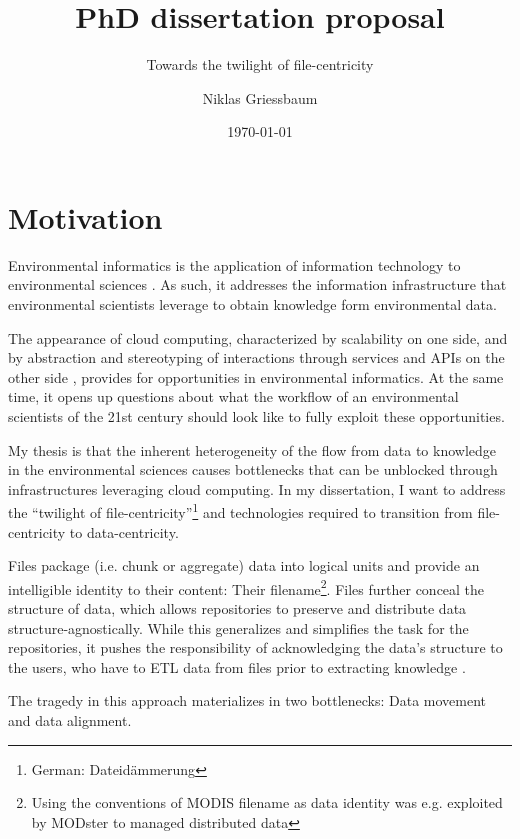 \documentclass[letterpaper, parskip=half]{scrartcl}
\title{PhD dissertation proposal}
\subtitle{Towards the twilight of file-centricity}
\author{Niklas Griessbaum}
\date{\today}
\begin{document}
\maketitle

\newpage
\tableofcontents

\newpage
\printglossaries


\newpage

\section{Motivation}

Environmental informatics is the application of information technology to environmental sciences \citep{Frew2012}.
As such, it addresses the information infrastructure that environmental scientists leverage
to obtain knowledge form environmental data.

The appearance of cloud computing, characterized by scalability on one side, 
and by abstraction and stereotyping of interactions through services and \glspl{API} on the other side \citep{Foster2017}, 
provides for opportunities in environmental informatics. 
At the same time, it opens up questions about what the workflow of an environmental scientists of the 21st century should look like to fully exploit these opportunities.

My thesis is that the inherent heterogeneity of the flow from data to knowledge in the environmental sciences causes bottlenecks that can be unblocked through infrastructures leveraging cloud computing. 
In my dissertation, I want to address the ``twilight of file-centricity''\footnote{German: Dateidämmerung } and technologies required to transition from file-centricity to data-centricity.

Files package (i.e. chunk or aggregate) data into logical units and provide an intelligible identity to their content: Their filename\footnote{Using the conventions of \gls{MODIS} filename as data identity was e.g. exploited by MODster \citep{Frew2005, Frew2002} to managed distributed data}.
Files further conceal the structure of data, which allows repositories to preserve and distribute data structure-agnostically. 
While this generalizes and simplifies the task for the repositories, it pushes the responsibility of acknowledging the data's structure to the users, who have to \gls{ETL} data from files prior to extracting knowledge \citep{Rilee2016, Szalay2009}.

The tragedy in this approach materializes in two bottlenecks: Data movement and data alignment.
\end{document}
